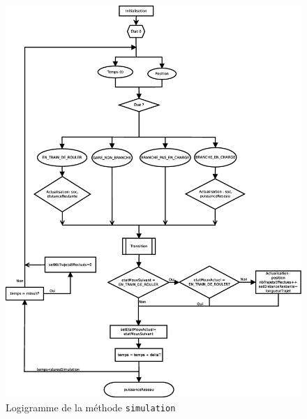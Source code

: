			\begin{figure}[h]
				\centering
				\caption{Logigramme de la méthode \texttt{simulation} \label{fig.flowPrincipal}}
				\includegraphics[height=0.9\textheight]{fig/flowPrincipal.eps}
			\end{figure}
